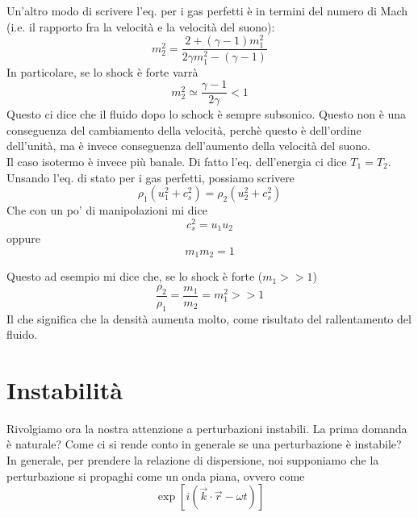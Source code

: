 \documentclass{report}
\begin{document}
\begin{enumerate}
    Un'altro modo di scrivere l'eq. per i gas perfetti è in termini del numero di Mach (i.e. il rapporto fra la velocità e la velocità del suono): 
    \begin{equation}
        m_2^2  = \frac{2 + (\gamma -1)m_1^2}{2\gamma m_1^2 - (\gamma -1)}
    \end{equation}
    In particolare, se lo shock è forte varrà 
    \begin{equation}
        m_2^2 \simeq \frac{\gamma -1}{2\gamma} < 1
    \end{equation}
    Questo ci dice che il fluido dopo lo schock è sempre subsonico. Questo non è una conseguenza del cambiamento della velocità, perchè questo è dell'ordine dell'unità, ma è invece conseguenza dell'aumento della velocità del suono. \\

    Il caso isotermo è invece più banale. Di fatto l'eq. dell'energia ci dice $T_1 = T_2$. Unsando l'eq. di stato per i gas perfetti, possiamo scrivere 
    \begin{equation}
        \rho_1(u_1^2 + c_s^2) = \rho_2(u_2^2 + c_s^2)
    \end{equation}
    Che con un po' di manipolazioni mi dice 
    \begin{equation}
        c_s^2 = u_1u_2
    \end{equation}
    oppure 
    \begin{equation}
        m_1m_2 = 1
    \end{equation}

    Questo ad esempio mi dice che, se lo shock è forte ($m_1 >>1$)
    \begin{equation}
        \frac{\rho_2}{\rho_1} = \frac{m_1}{m_2} = m_1^2 >>1
    \end{equation}
    Il che significa che la densità aumenta molto, come risultato del rallentamento del fluido. 
\end{enumerate}

\newpage
\chapter{Instabilità}

Rivolgiamo ora la nostra attenzione a perturbazioni instabili. La prima domanda è naturale? Come ci si rende conto in generale se una perturbazione è instabile? \\

In generale, per prendere la relazione di dispersione, noi supponiamo che la perturbazione si propaghi come un onda piana, ovvero come 
\begin{equation}
    \exp[i(\vec{k}\cdot \vec{r} - \omega t)]
\end{equation}
\end{document}

